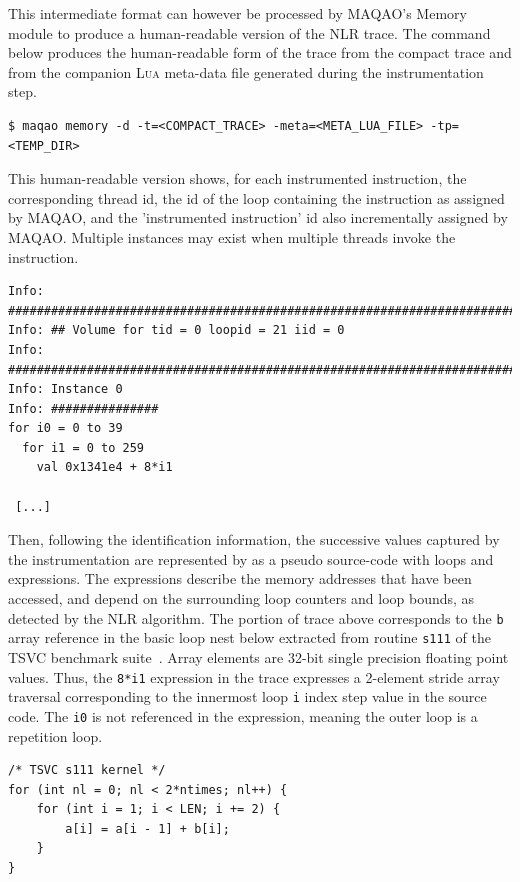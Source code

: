\documentclass[11pt, a4paper, twoside]{montblanc2}
\def\lua{\textsc{Lua}\xspace}
\begin{document}
This intermediate format can however be processed by MAQAO's Memory module to 
produce a human-readable version of the NLR trace. The command below produces
the human-readable form of the trace from the compact trace and from the companion
\lua meta-data file generated during the instrumentation step.
 
\begin{verbatim}
$ maqao memory -d -t=<COMPACT_TRACE> -meta=<META_LUA_FILE> -tp=<TEMP_DIR>
\end{verbatim}

 This human-readable version shows, for each instrumented instruction, the
 corresponding thread id, the id of the loop containing the instruction as
 assigned by MAQAO, and the 'instrumented instruction' id also incrementally
 assigned by MAQAO. Multiple instances may exist when multiple threads invoke
 the instruction.

\begin{footnotesize}
\begin{verbatim}
Info: ################################################################################
Info: ## Volume for tid = 0 loopid = 21 iid = 0
Info: ################################################################################
Info: Instance 0
Info: ###############
for i0 = 0 to 39
  for i1 = 0 to 259
    val 0x1341e4 + 8*i1

 [...]
\end{verbatim}
\end{footnotesize}

Then, following the identification information, the successive values captured
by the instrumentation are represented by as a pseudo source-code with loops and
expressions. The expressions describe the memory addresses that have been
accessed, and depend on the surrounding loop counters and loop bounds, as
detected by the NLR algorithm. The portion of trace above corresponds to the
\texttt{b} array reference in the basic loop nest below extracted from routine
\texttt{s111} of the TSVC benchmark
suite~\cite{maleki:vectorization:pact:2011,callahan:tsvc:sc:1988}. Array
elements are 32-bit single precision floating point values. Thus, the
\texttt{8*i1} expression in the trace expresses a 2-element stride array
traversal corresponding to the innermost loop \texttt{i} index step value in the
source code. The \texttt{i0} is not referenced in the expression, meaning the
outer loop is a repetition loop.

\lstset{style=C}
\begin{lstlisting}
/* TSVC s111 kernel */
for (int nl = 0; nl < 2*ntimes; nl++) {
	for (int i = 1; i < LEN; i += 2) {
		a[i] = a[i - 1] + b[i];
	}
}
\end{lstlisting}
\end{document}
